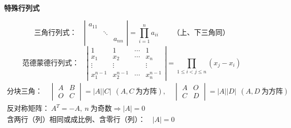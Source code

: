\documentclass[11pt,a4paper]{ctexart}
\newcommand{\hd}[1]{\textbf{\color{mainc!85!black}#1}\par\nobreak\nopagebreak[4]}
\begin{document}
\begin{secbox}[一、行列式]
\hd{特殊行列式}
\begin{formbox}
\[
\text{三角行列式：}\quad
\left|\begin{matrix}a_{11}& & \\ &\ddots& \\ &&a_{nn}\end{matrix}\right|
=\prod_{i=1}^{n}a_{ii}
\qquad\text{（上、下三角同）}
\]
\[
\text{范德蒙德行列式：}\quad
\left|\begin{matrix}
1&1&\cdots&1\\
x_{1}&x_{2}&\cdots&x_{n}\\
\vdots&\vdots&&\vdots\\
x_{1}^{n-1}&x_{2}^{n-1}&\cdots&x_{n}^{n-1}
\end{matrix}\right|
=\prod_{1\le i<j\le n}(x_{j}-x_{i})
\]
\[
\begin{gathered}
\text{分块三角：}\quad
\begin{vmatrix}A&B\\ O&C\end{vmatrix}=|A||C|\ \ (A,C\ \text{为方阵}),\quad
\begin{vmatrix}A&O\\ C&D\end{vmatrix}=|A||D|\ \ (A,D\ \text{为方阵})\\[4pt]
\text{反对称矩阵：}\ A^{T}=-A,\ n\ \text{为奇数}\Rightarrow|A|=0\\[4pt]
\text{含两行（列）相同或成比例、含零行（列）：}\quad |A|=0
\end{gathered}
\]
\end{formbox}
\end{secbox}
\end{document}
